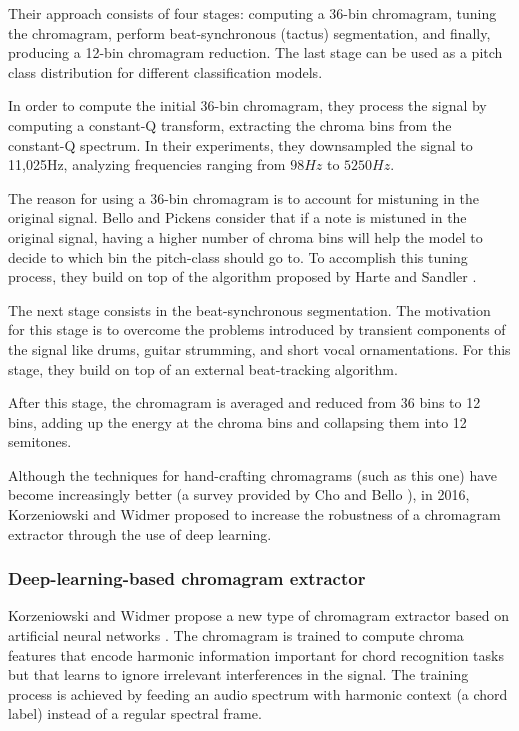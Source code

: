 Their approach consists of four stages: computing a 36-bin chromagram, tuning the chromagram, perform beat-synchronous (tactus) segmentation, and finally, producing a 12-bin chromagram reduction. The last stage can be used as a pitch class distribution for different classification models.

In order to compute the initial 36-bin chromagram, they process the signal by computing a constant-Q transform, extracting the chroma bins from the constant-Q spectrum. In their experiments, they downsampled the signal to 11,025Hz, analyzing frequencies ranging from $98Hz$ to $5250Hz$.

The reason for using a 36-bin chromagram is to account for mistuning in the original signal. Bello and Pickens consider that if a note is mistuned in the original signal, having a higher number of chroma bins will help the model to decide to which bin the pitch-class should go to. To accomplish this tuning process, they build on top of the algorithm proposed by Harte and Sandler \cite{harte_automatic_2005}.

The next stage consists in the beat-synchronous segmentation. The motivation for this stage is to overcome the problems introduced by transient components of the signal like drums, guitar strumming, and short vocal ornamentations. For this stage, they build on top of an external beat-tracking algorithm.

After this stage, the chromagram is averaged and reduced from 36 bins to 12 bins, adding up the energy at the chroma bins and collapsing them into 12 semitones.

Although the techniques for hand-crafting chromagrams (such as this one) have become increasingly better (a survey provided by Cho and Bello \cite{cho_relative_2014}), in 2016, Korzeniowski and Widmer proposed to increase the robustness of a chromagram extractor through the use of deep learning.

\subsubsection{Deep-learning-based chromagram extractor}
Korzeniowski and Widmer propose a new type of chromagram extractor based on artificial neural networks \cite{korzeniowski_feature_2016}. The chromagram is trained to compute chroma features that encode harmonic information important for chord recognition tasks but that learns to ignore irrelevant interferences in the signal. The training process is achieved by feeding an audio spectrum with harmonic context (a chord label) instead of a regular spectral frame.

